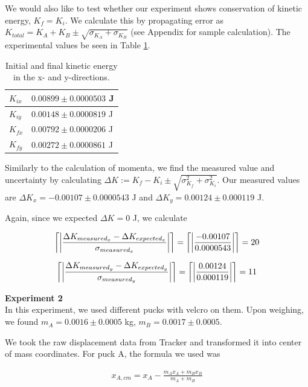 \documentclass[11pt]{article}
\DeclarePairedDelimiter{\ceil}{\lceil}{\rceil}
\begin{document}
We would also like to test whether our experiment shows conservation of kinetic energy, $K_f = K_i$. We calculate this by propagating error as $K_{total} = K_A+K_B \pm \sqrt{\sigma_{K_A}+\sigma_{K_B}}$ (see Appendix for sample calculation). The experimental values be seen in Table \ref{tabkin}.

\begin{table}[]
\centering
\caption{Initial and final kinetic energy in the x- and y-directions.}
\label{tabkin}
\begin{tabular}{|l|l|}
\hline
$K_{ix}$ & $0.00899\pm0.0000503$ J  \\ \hline
$K_{iy}$ & $0.00148\pm 0.0000819$ J \\ \hline
$K_{fx}$ & $0.00792\pm 0.0000206$  J \\ \hline
$K_{fy}$ & $0.00272 \pm 0.0000861$  J\\ \hline
\end{tabular}
\end{table}

Similarly to the calculation of momenta, we find the measured value and uncertainty by calculating $\Delta K := K_{f}-K_{i} \pm \sqrt{\sigma_{K_{f}}^2+\sigma_{K_{i}}^2}$. Our measured values are $\Delta K_x = -0.00107 \pm 0.0000543$ J and $\Delta K_y = 0.00124\pm 0.000119$ J.

Again, since we expected $\Delta K = 0$ J, we calculate

\begin{align}
\ceil*{\left\vert\frac{\Delta K_{measured_x}-\Delta K_{expected_x}}{\sigma_{measured_x}}\right\vert} = \ceil*{\left\vert\frac{-0.00107}{0.0000543}\right\vert} = 20
\label{errKx}
\end{align}

\begin{align}
\ceil*{\left\vert\frac{\Delta K_{measured_y}-\Delta K_{expected_y}}{\sigma_{measured_y}}\right\vert} = \ceil*{\left\vert\frac{0.00124}{0.000119}\right\vert} = 11
\label{errKy}
\end{align}


{\bf Experiment 2}\\

In this experiment, we used different pucks with velcro on them. Upon weighing, we found $m_A = 0.0016 \pm 0.0005$ kg, $m_B = 0.0017 \pm 0.0005$.

We took the raw displacement data from Tracker and transformed it into center of mass coordinates. For puck A, the formula we used was

\begin{align}
x_{A,cm}=x_A-\frac{m_A x_A+ m_B x_B}{m_A + m_B}
\end{align}
\end{document}
